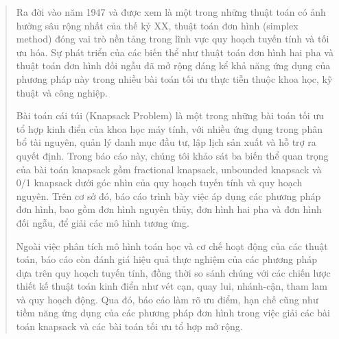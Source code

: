 \documentclass[fontsize=13pt,a4paper]{report}
\begin{document}
\coverpage
\secondcoverpage

\begin{abstract}
Ra đời vào năm 1947 và được xem là một trong những thuật toán có ảnh hưởng sâu rộng nhất của thế kỷ XX, thuật toán đơn hình (simplex method) đóng vai trò nền tảng trong lĩnh vực quy hoạch tuyến tính và tối ưu hóa. Sự phát triển của các biến thể như thuật toán đơn hình hai pha và thuật toán đơn hình đối ngẫu đã mở rộng đáng kể khả năng ứng dụng của phương pháp này trong nhiều bài toán tối ưu thực tiễn thuộc khoa học, kỹ thuật và công nghiệp.

Bài toán cái túi (Knapsack Problem) là một trong những bài toán tối ưu tổ hợp kinh điển của khoa học máy tính, với nhiều ứng dụng trong phân bổ tài nguyên, quản lý danh mục đầu tư, lập lịch sản xuất và hỗ trợ ra quyết định. Trong báo cáo này, chúng tôi khảo sát ba biến thể quan trọng của bài toán knapsack gồm fractional knapsack, unbounded knapsack và 0/1 knapsack dưới góc nhìn của quy hoạch tuyến tính và quy hoạch nguyên. Trên cơ sở đó, báo cáo trình bày việc áp dụng các phương pháp đơn hình, bao gồm đơn hình nguyên thủy, đơn hình hai pha và đơn hình đối ngẫu, để giải các mô hình tương ứng.

Ngoài việc phân tích mô hình toán học và cơ chế hoạt động của các thuật toán, báo cáo còn đánh giá hiệu quả thực nghiệm của các phương pháp dựa trên quy hoạch tuyến tính, đồng thời so sánh chúng với các chiến lược thiết kế thuật toán kinh điển như vét cạn, quay lui, nhánh-cận, tham lam và quy hoạch động. Qua đó, báo cáo làm rõ ưu điểm, hạn chế cũng như tiềm năng ứng dụng của các phương pháp đơn hình trong việc giải các bài toán knapsack và các bài toán tối ưu tổ hợp mở rộng.
\end{abstract}

\printnomenclature
\tableofcontents
\vfil\null\endtitlepage

\fancyhead{}
\renewcommand{\footrulewidth}{0.4pt}
\pagestyle{fancy}





\end{document}
